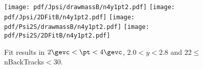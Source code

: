 \begin{figure}[H]
\begin{center}
\texttt{[image: pdf/Jpsi/drawmassB/n4y1pt2.pdf]}
\texttt{[image: pdf/Jpsi/2DFitB/n4y1pt2.pdf]}
\vspace*{-0.5cm}
\texttt{[image: pdf/Psi2S/drawmassB/n4y1pt2.pdf]}
\texttt{[image: pdf/Psi2S/2DFitB/n4y1pt2.pdf]}
\vspace*{-0.5cm}
\end{center}
\caption{Fit results in $2\gevc<\pt<4\gevc$, $2.0<y<2.8$ and 22$\leq$nBackTracks$<$30.}
\label{Fitn4y1pt2}
\end{figure}
